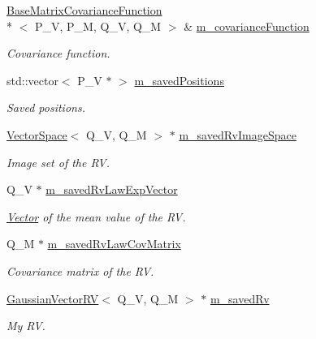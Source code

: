 \begin{DoxyCompactItemize}
\hyperlink{class_q_u_e_s_o_1_1_base_matrix_covariance_function}{Base\-Matrix\-Covariance\-Function}\\*
$<$ P\-\_\-\-V, P\-\_\-\-M, Q\-\_\-\-V, Q\-\_\-\-M $>$ \& \hyperlink{class_q_u_e_s_o_1_1_vector_gaussian_random_field_a67b1325646a7076207d768cfd796eb95}{m\-\_\-covariance\-Function}
\begin{DoxyCompactList}\small\item\em Covariance function. \end{DoxyCompactList}\item 
std\-::vector$<$ P\-\_\-\-V $\ast$ $>$ \hyperlink{class_q_u_e_s_o_1_1_vector_gaussian_random_field_aa51f310fb54dd4807522a0e72be61acd}{m\-\_\-saved\-Positions}
\begin{DoxyCompactList}\small\item\em Saved positions. \end{DoxyCompactList}\item 
\hyperlink{class_q_u_e_s_o_1_1_vector_space}{Vector\-Space}$<$ Q\-\_\-\-V, Q\-\_\-\-M $>$ $\ast$ \hyperlink{class_q_u_e_s_o_1_1_vector_gaussian_random_field_a8fba910fff533442361ad7bd93e5706b}{m\-\_\-saved\-Rv\-Image\-Space}
\begin{DoxyCompactList}\small\item\em Image set of the R\-V. \end{DoxyCompactList}\item 
Q\-\_\-\-V $\ast$ \hyperlink{class_q_u_e_s_o_1_1_vector_gaussian_random_field_a544ce2c5ff0329b6fb7c625e71eb3576}{m\-\_\-saved\-Rv\-Law\-Exp\-Vector}
\begin{DoxyCompactList}\small\item\em \hyperlink{class_q_u_e_s_o_1_1_vector}{Vector} of the mean value of the R\-V. \end{DoxyCompactList}\item 
Q\-\_\-\-M $\ast$ \hyperlink{class_q_u_e_s_o_1_1_vector_gaussian_random_field_a0a07c1eec3d56ef764b13586a36921d3}{m\-\_\-saved\-Rv\-Law\-Cov\-Matrix}
\begin{DoxyCompactList}\small\item\em Covariance matrix of the R\-V. \end{DoxyCompactList}\item 
\hyperlink{class_q_u_e_s_o_1_1_gaussian_vector_r_v}{Gaussian\-Vector\-R\-V}$<$ Q\-\_\-\-V, Q\-\_\-\-M $>$ $\ast$ \hyperlink{class_q_u_e_s_o_1_1_vector_gaussian_random_field_a7e2ed5d146f65c8c4ddbd1d4e496647d}{m\-\_\-saved\-Rv}
\begin{DoxyCompactList}\small\item\em My R\-V. \end{DoxyCompactList}\end{DoxyCompactItemize}


